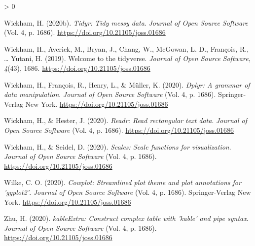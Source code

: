 \documentclass[
  english,
  ,man,floatsintext]{apa6}
\newlength{\cslhangindent}
\newenvironment{CSLReferences}[2] %
 {%
  \setlength{\parindent}{0pt}
  \ifodd #1 \everypar{\setlength{\hangindent}{\cslhangindent}}\ignorespaces\fi
  \ifnum #2 > 0
  \setlength{\parskip}{#2\baselineskip}
  \fi
 }%
 {}
\begin{document}
\begin{CSLReferences}{1}{0}
\leavevmode\hypertarget{ref-R-tidyr}{}%
Wickham, H. (2020b). \emph{Tidyr: Tidy messy data}. \emph{Journal of Open Source Software} (Vol. 4, p. 1686). \url{https://doi.org/10.21105/joss.01686}

\leavevmode\hypertarget{ref-R-tidyverse}{}%
Wickham, H., Averick, M., Bryan, J., Chang, W., McGowan, L. D., François, R., \ldots{} Yutani, H. (2019). Welcome to the {tidyverse}. \emph{Journal of Open Source Software}, \emph{4}(43), 1686. \url{https://doi.org/10.21105/joss.01686}

\leavevmode\hypertarget{ref-R-dplyr}{}%
Wickham, H., François, R., Henry, L., \& Müller, K. (2020). \emph{Dplyr: A grammar of data manipulation}. \emph{Journal of Open Source Software} (Vol. 4, p. 1686). Springer-Verlag New York. \url{https://doi.org/10.21105/joss.01686}

\leavevmode\hypertarget{ref-R-readr}{}%
Wickham, H., \& Hester, J. (2020). \emph{Readr: Read rectangular text data}. \emph{Journal of Open Source Software} (Vol. 4, p. 1686). \url{https://doi.org/10.21105/joss.01686}

\leavevmode\hypertarget{ref-R-scales}{}%
Wickham, H., \& Seidel, D. (2020). \emph{Scales: Scale functions for visualization}. \emph{Journal of Open Source Software} (Vol. 4, p. 1686). \url{https://doi.org/10.21105/joss.01686}

\leavevmode\hypertarget{ref-R-cowplot}{}%
Wilke, C. O. (2020). \emph{Cowplot: Streamlined plot theme and plot annotations for 'ggplot2'}. \emph{Journal of Open Source Software} (Vol. 4, p. 1686). Springer-Verlag New York. \url{https://doi.org/10.21105/joss.01686}

\leavevmode\hypertarget{ref-R-kableExtra}{}%
Zhu, H. (2020). \emph{kableExtra: Construct complex table with 'kable' and pipe syntax}. \emph{Journal of Open Source Software} (Vol. 4, p. 1686). \url{https://doi.org/10.21105/joss.01686}

\end{CSLReferences}

\endgroup


\clearpage
\makeatletter
\efloat@restorefloats
\makeatother
\end{document}
